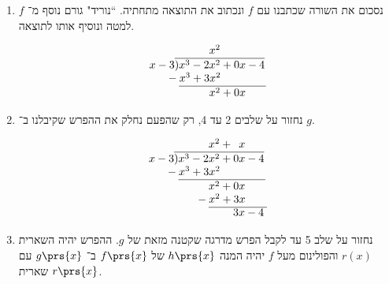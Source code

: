 \documentclass[article, 10pt,oneside]{article}
\begin{document}
\begin{algorithm}
\begin{enumerate}
\item
נסכום את השורה שכתבנו עם
$f$
ונכתוב את התוצאה מתחתיה.
``נוריד"
גורם נוסף מ־%
$f$
למטה ונוסיף אותו לתוצאה.

\begin{otherlanguage}{english}
\[
\begin{array}{l}
{\hphantom{x-3) x^3 - 2}}x^2\\
x-3\overline{) x^3 - 2x^2 + 0x - 4} \\
\hphantom{x-3} \hspace{-8pt} -x^3 + 3x^2 \\
\hphantom{x-3)} \overline{\hphantom{x^3 -3 } x^2 + 0x \hphantom{-4..}}
\end{array}
\]
\end{otherlanguage}

\item
נחזור על שלבים 2 עד 4, רק שהפעם נחלק את ההפרש שקיבלנו ב־%
$g$.

\begin{otherlanguage}{english}
\[
\begin{array}{l}
{\hphantom{x-3) x^3 - 2}}x^2 + \hphantom{0} x\\
x-3\overline{) x^3 - 2x^2 + 0x - 4} \\
\hphantom{x-3} \hspace{-8pt} -x^3 + 3x^2 \\
\hphantom{x-3)} \overline{\hphantom{x^3 -3 } x^2 + 0x \hphantom{-4..}}
\\
\hphantom{x-3)} \hphantom{x^3 -3 } \hspace{-12pt} -x^2 + 3x
\\
\hphantom{x-3 ) x^3 + 2}\overline{\hphantom{x^2 +. \hspace{-3pt}} 3x - 4 \hphantom{.}}
\end{array}
\]
\end{otherlanguage}

\item
נחזור על שלב 5 עד לקבל הפרש מדרגה שקטנה מזאת של
$g$.
ההפרש יהיה השארית
$r(x)$
והפולינום מעל
$f$
יהיה המנה
$h\prs{x}$
של
$f\prs{x}$
ב־%
$g\prs{x}$
עם שארית
$r\prs{x}$.


\end{enumerate}
\end{algorithm}
\end{document}

